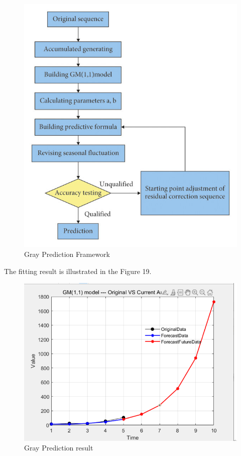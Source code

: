 \documentclass{apmcmthesis}
\begin{document}
\begin{figure}[htbp]
    \centering
    \includegraphics[scale=1]{figures/Figure/Grayl.png}
    \caption{Gray Prediction Framework}
\end{figure}


The fitting result is illustrated in the Figure 19.

\begin{figure}[htbp]
    \centering
    \includegraphics[scale=1]{figures/Figure/result.png}
    \caption{Gray Prediction result}
\end{figure}
\end{document}
